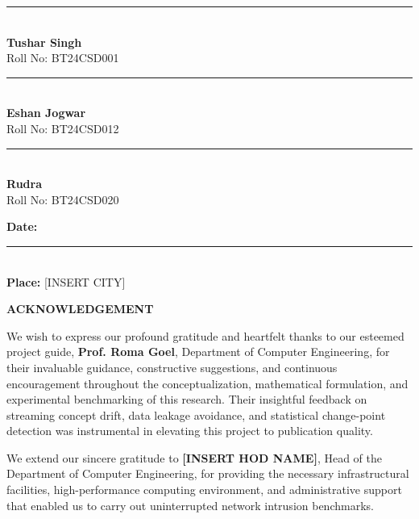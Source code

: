 \documentclass[12pt,a4paper,oneside]{report}
\begin{document}
\noindent
\begin{minipage}{0.32\textwidth}
\begin{center}
\rule{4.5cm}{0.4pt}\\[0.2cm]
\textbf{Tushar Singh}\\
Roll No: BT24CSD001
\end{center}
\end{minipage}
\hfill
\begin{minipage}{0.32\textwidth}
\begin{center}
\rule{4.5cm}{0.4pt}\\[0.2cm]
\textbf{Eshan Jogwar}\\
Roll No: BT24CSD012
\end{center}
\end{minipage}
\hfill
\begin{minipage}{0.32\textwidth}
\begin{center}
\rule{4.5cm}{0.4pt}\\[0.2cm]
\textbf{Rudra}\\
Roll No: BT24CSD020
\end{center}
\end{minipage}

\vspace{2.0cm}
\noindent \textbf{Date:} \rule{4cm}{0.4pt} \\
\noindent \textbf{Place:} [INSERT CITY]

\newpage
\thispagestyle{plain}
\begin{center}
{\LARGE \textbf{ACKNOWLEDGEMENT}}\\[1.0cm]
\end{center}

\noindent We wish to express our profound gratitude and heartfelt thanks to our esteemed project guide, \textbf{Prof. Roma Goel}, Department of Computer Engineering, for their invaluable guidance, constructive suggestions, and continuous encouragement throughout the conceptualization, mathematical formulation, and experimental benchmarking of this research. Their insightful feedback on streaming concept drift, data leakage avoidance, and statistical change-point detection was instrumental in elevating this project to publication quality.

\vspace{0.4cm}
\noindent We extend our sincere gratitude to \textbf{[INSERT HOD NAME]}, Head of the Department of Computer Engineering, for providing the necessary infrastructural facilities, high-performance computing environment, and administrative support that enabled us to carry out uninterrupted network intrusion benchmarks.
\end{document}

